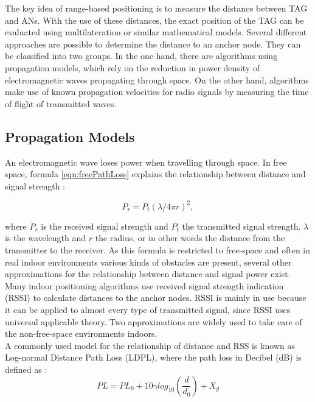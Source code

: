 The key idea of range-based positioning is to measure the distance between TAG and ANs. With the use of these distances, the exact position of the TAG can be evaluated using multilateration or similar mathematical models. Several different approaches are possible to determine the distance to an anchor node. They can be classified into two groups. In the one hand, there are algorithms using propagation models, which rely on the reduction in power density of electromagnetic waves propagating through space. On the other hand, algorithms make use of known propagation velocities for radio signals  by measuring the time of flight of transmitted waves. 

\subsection{Propagation Models}
An electromagnetic wave loses power when travelling through space. In free space, formula \ref{eqn:freePathLoss} explains the relationship between distance and signal strength \cite{VorlesungCN}:

\begin{equation}
P_{r} = P_{t} (\lambda/4\pi r)^2,
\label{eqn:freePathLoss}
\end{equation}

where $P_{r}$ is the received signal strength and $P_{t}$ the transmitted signal strength. $\lambda$ is the wavelength and $r$ the radius, or in other words the distance from the transmitter to the receiver. As this formula is restricted to free-space and often in real indoor environments various kinds of obstacles are present, several other approximations for the relationship between distance and signal power exist. Many indoor positioning algorithms use received signal strength indication (RSSI) to calculate distances to the anchor nodes. RSSI is mainly in use because it can be applied to almost every type of transmitted signal, since RSSI uses universal applicable theory. Two approximations are widely used to take care of the non-free-space environments indoors.\\
\noindent\hspace*{5mm}%
A commonly used model for the relationship of distance and RSS is known as Log-normal Distance Path Loss (LDPL), where the path loss in Decibel (dB) is defined as \cite{Sarkar}:
\begin{equation}
PL = PL_{0} +10 \gamma log_{10} (\frac{d}{d_{0}}) + X_{g}
\label{eqn:LDPL}
\end{equation}

